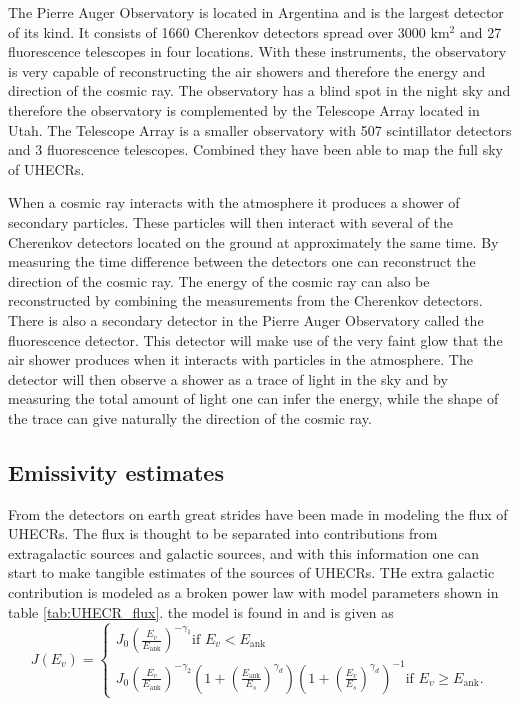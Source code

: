 The Pierre Auger Observatory is located in Argentina and is the largest detector of its kind. It consists of 1660 Cherenkov detectors spread over 3000 km$^2$ and 27 fluorescence telescopes in four locations. With these instruments, the observatory is very capable of reconstructing the air showers and therefore the energy and direction of the cosmic ray. The observatory has a blind spot in the night sky and therefore the observatory is complemented by the Telescope Array located in Utah. The Telescope Array is a smaller observatory with 507 scintillator detectors and 3 fluorescence telescopes. Combined they have been able to map the full sky of UHECRs.

When a cosmic ray interacts with the atmosphere it produces a shower of secondary particles. These particles will then interact with several of the Cherenkov detectors located on the ground at approximately the same time. By measuring the time difference between the detectors one can reconstruct the direction of the cosmic ray. The energy of the cosmic ray can also be reconstructed by combining the measurements from the Cherenkov detectors. There is also a secondary detector in the Pierre Auger Observatory called the fluorescence detector. This detector will make use of the very faint glow that the air shower produces when it interacts with particles in the atmosphere. The detector will then observe a shower as a trace of light in the sky and by measuring the total amount of light one can infer the energy, while the shape of the trace can give naturally the direction of the cosmic ray.

\subsection{Emissivity estimates}
\label{sec:emmisivity}
From the detectors on earth great strides have been made in modeling the flux of UHECRs. The flux is thought to be separated into contributions from extragalactic sources and galactic sources, and with this information one can start to make tangible estimates of the sources of UHECRs. THe extra galactic contribution is modeled as a broken power law with  model parameters shown in table \ref{tab:UHECR_flux}. the model is found in \cite{thepierreaugercollaboration2017pierre} and is given as 
\begin{equation}
    J(E_v) = \begin{cases} 
        J_0 \left(\frac{E_v}{E_{\text{ank}}}\right)^{-\gamma_1}  \text{if } E_v < E_{\text{ank}} \\
        J_0 \left(\frac{E_v}{E_{\text{ank}}}\right)^{-\gamma_2} \left(1 + \left(\frac{E_{\text{ank}}}{E_s}\right)^{\gamma_d}\right) \left(1 + \left(\frac{E_v}{E_s}\right)^{\gamma_d}\right)^{-1}   \text{if } E_v \geq E_{\text{ank}}.
    \end{cases}
\end{equation}

